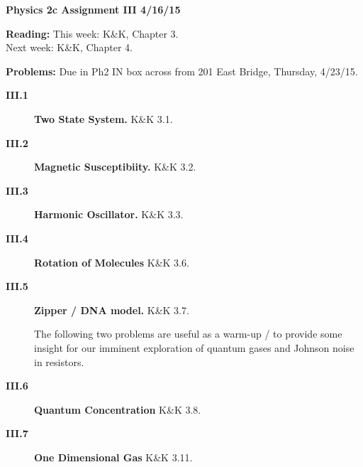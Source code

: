 \documentclass[11pt]{article}
\begin{document}
%
\centerline{\large\bf Physics 2c \hfill Assignment III \hfill  4/16/15}

\medskip
\begin{list}{}{\leftmargin 2.4cm  .2cm }
\item[{\bf Reading:}  \hfill ] This week: K\&K, Chapter 3. \\
                               Next week: K\&K, Chapter 4.
\item[{\bf Problems:} \hfill ] Due in Ph2 IN box across from 201 East Bridge, Thursday, 4/23/15.
\end{list}

\begin{description}

\item[{\bf III.1} ] {\bf Two State System.} K\&K 3.1.

\item[{\bf III.2} ] {\bf Magnetic Susceptibiity.} K\&K 3.2.

\item[{\bf III.3} ] {\bf Harmonic Oscillator.} K\&K 3.3.

\item[{\bf III.4} ] {\bf Rotation of Molecules} K\&K 3.6.

\item[{\bf III.5} ] {\bf Zipper / DNA model.} K\&K 3.7.

The following two problems are useful as a warm-up / to provide some insight for our imminent exploration of quantum gases and Johnson noise in resistors.

\item[{\bf III.6} ] {\bf Quantum Concentration} K\&K 3.8.

\item[{\bf III.7} ] {\bf One Dimensional Gas} K\&K 3.11.

\end{description}
\end{document}
